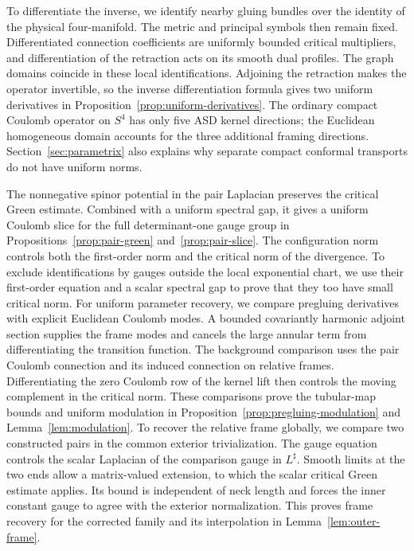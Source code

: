 \documentclass[11pt]{amsart}
\theoremstyle{definition}
\theoremstyle{remark}
\theoremstyle{plain}
\begin{document}
To differentiate the inverse, we identify nearby gluing bundles over the
identity of the physical four-manifold.  The metric and principal symbols
then remain fixed.  Differentiated connection coefficients are uniformly
bounded critical multipliers, and differentiation of the retraction acts
on its smooth dual profiles.  The graph domains coincide in these local
identifications.  Adjoining the retraction makes the operator invertible,
so the inverse differentiation formula gives two uniform derivatives in
Proposition~\ref{prop:uniform-derivatives}.
The ordinary compact Coulomb operator on $S^4$ has only five ASD kernel directions;
the Euclidean homogeneous domain accounts for the three additional
framing directions.  Section~\ref{sec:parametrix} also explains why
separate compact conformal transports do not have uniform norms.

The nonnegative spinor potential in the pair Laplacian preserves the
critical Green estimate.  Combined with a uniform spectral gap, it gives
a uniform Coulomb slice for the full determinant-one gauge group in
Propositions~\ref{prop:pair-green} and~\ref{prop:pair-slice}.
The configuration norm controls both the first-order norm and the critical
norm of the divergence.  To exclude identifications by gauges outside the
local exponential chart, we use their first-order equation and a scalar
spectral gap to prove that they too have small critical norm.
For uniform parameter recovery, we compare pregluing derivatives with
explicit Euclidean Coulomb modes.  A bounded covariantly harmonic adjoint
section supplies the frame modes and cancels the large annular term from
differentiating the transition function.  The background comparison uses
the pair Coulomb connection and its induced connection on relative frames.
Differentiating the zero Coulomb row of the kernel lift then controls
the moving complement in the critical norm.  These comparisons prove
the tubular-map bounds and uniform modulation in
Proposition~\ref{prop:pregluing-modulation} and Lemma~\ref{lem:modulation}.
To recover the relative frame globally, we compare two constructed pairs
in the common exterior trivialization.  The gauge equation controls the
scalar Laplacian of the comparison gauge in $L^\sharp$.  Smooth limits at
the two ends allow a matrix-valued extension, to which the scalar critical
Green estimate applies.  Its bound is independent of neck length and
forces the inner constant gauge to agree with the exterior normalization.
This proves frame recovery for the corrected family and its interpolation
in Lemma~\ref{lem:outer-frame}.
\end{document}
